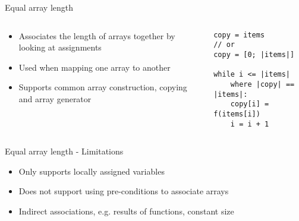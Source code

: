 \begin{frame}[fragile]{Equal array length}

\begin{columns}

\begin{column}{0.5\textwidth}
\begin{itemize}
    \item Associates the length of arrays together by looking at assignments
    \item Used when mapping one array to another
    \item Supports common array construction, copying and array generator
\end{itemize}
\end{column}

\begin{column}{0.5\textwidth}
\begin{verbatim}
copy = items
// or
copy = [0; |items|]

while i <= |items|
    where |copy| == |items|:
    copy[i] = f(items[i])
    i = i + 1
\end{verbatim}
\end{column}
\end{columns}

\end{frame}

\begin{frame}[fragile]{Equal array length - Limitations}

\begin{itemize}
    \item Only supports locally assigned variables
    \item Does not support using pre-conditions to associate arrays
    \item Indirect associations, e.g. results of functions, constant size
\end{itemize}

\end{frame}



